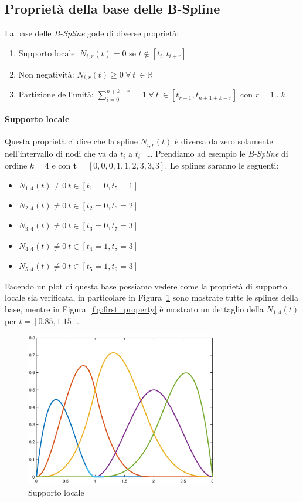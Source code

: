 \documentclass[a4paper, 12pt]{article}
\begin{document}
\subsection{Proprietà della base delle B-Spline}
La base delle \textit{B-Spline} gode di diverse proprietà:
\begin{enumerate}
  \item Supporto locale: $N_{i, r}(t) = 0 \text{ se } t \notin [t_i, t_{i+r}]$
  \item Non negatività: $N_{i, r}(t) \geq 0\ \forall \ t \ \in \mathbb{R}$
  \item Partizione dell'unità: $\sum_{i = 0}^{n+k-r} = 1 \ \forall \  t \ \in [t_{r-1}, t_{n+1+k-r}] \text{ con } r = 1 \dots k$
\end{enumerate}
\paragraph{Supporto locale}
Questa proprietà ci dice che la spline $N_{i, r}(t)$ è diversa da zero solamente nell'intervallo di nodi che va 
da $t_i$ a $t_{i+r}$. Prendiamo ad esempio le \textit{B-Spline} di ordine $k = 4$ e 
con $\mathbf{t} = [0, 0, 0, 1, 1, 2, 3, 3, 3]$. Le splines saranno le seguenti:
\begin{itemize}
  \item $N_{1, 4}(t)\neq 0\ t \in [t_1 = 0, t_5 = 1]$
  \item $N_{2, 4}(t)\neq 0\ t \in [t_2 = 0, t_6 = 2]$
  \item $N_{3, 4}(t)\neq 0\ t \in [t_3 = 0, t_7 = 3]$
  \item $N_{4, 4}(t)\neq 0\ t \in [t_4 = 1, t_8 = 3]$
  \item $N_{5, 4}(t)\neq 0\ t \in [t_5 = 1, t_9 = 3]$
\end{itemize}
Facendo un plot di questa base possiamo vedere come la proprietà di supporto locale sia verificata, in particolare in Figura~\ref{fig:local_support} sono mostrate
tutte le splines della base, mentre in Figura~\ref{fig:first_property} è mostrato un dettaglio della $N_{1, 4}(t)$ per $t = [0.85, 1.15]$.
\begin{figure}[]
  \centering
  \includegraphics[width=0.75\textwidth]{figure/local_support.eps}
  \caption{Supporto locale}
  \label{fig:local_support}
\end{figure} 
\end{document}
